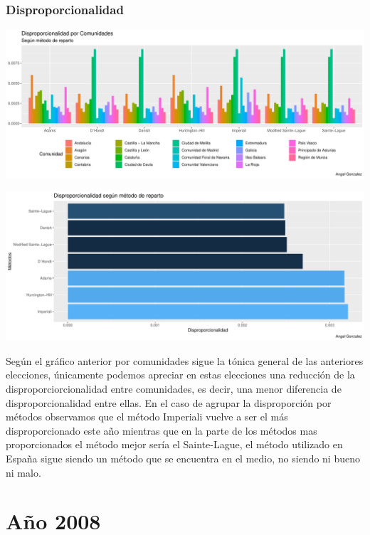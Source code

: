 \documentclass[12pt,a4paper,]{book}
\numberwithin{dummy}{section}
\theoremstyle{ocrenumbox}
\theoremstyle{blacknumex}
\theoremstyle{blacknumbox}
\theoremstyle{ocrenum}
\theoremstyle{ocrenum}
\begin{document}
\hypertarget{disproporcionalidad-7}{%
\subsubsection{Disproporcionalidad}\label{disproporcionalidad-7}}

\begin{center}\includegraphics[width=0.95\linewidth]{figurasR/unnamed-chunk-132-1} \end{center}

\begin{center}\includegraphics[width=0.95\linewidth]{figurasR/unnamed-chunk-132-2} \end{center}

Según el gráfico anterior por comunidades sigue la tónica general de las
anteriores elecciones, únicamente podemos apreciar en estas elecciones
una reducción de la disproporciorcionalidad entre comunidades, es decir,
una menor diferencia de disproporcionalidad entre ellas. En el caso de
agrupar la disproporción por métodos observamos que el método Imperiali
vuelve a ser el más disproporcionado este año mientras que en la parte
de los métodos mas proporcionados el método mejor sería el Sainte-Lague,
el método utilizado en España sigue siendo un método que se encuentra en
el medio, no siendo ni bueno ni malo.

\hypertarget{auxf1o-2008}{%
\section{Año 2008}\label{auxf1o-2008}}
\end{document}
